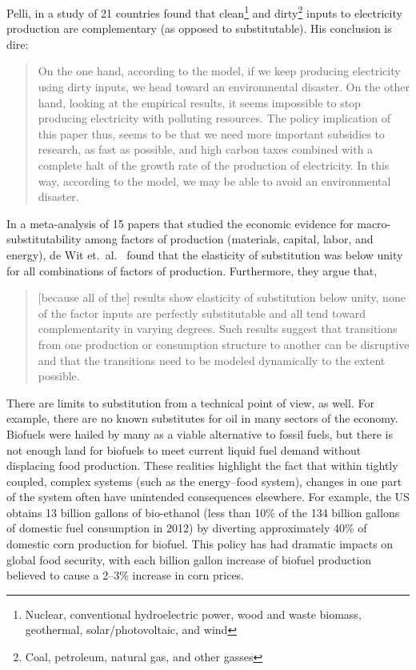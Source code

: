 Pelli, in a study of 21 countries 
found that clean\footnote{Nuclear, 
	conventional hydroelectric power, wood and waste biomass, 
	geothermal, solar/photovoltaic, and wind
	}
and dirty\footnote{Coal, 
	petroleum, natural gas, and other gasses
	}
inputs to electricity production
are complementary (as opposed to substitutable).\cite{Pelli:2012wv}
His conclusion is dire:

\begin{quote}
	On the one hand, according to the model, 
	if we keep producing electricity using dirty inputs, 
	we head toward an environmental disaster. 
	On the other hand, looking at the empirical results, 
	it seems impossible to stop producing electricity with polluting resources. 
	The policy implication of this paper thus, 
	seems to be that we need more important subsidies to research, 
	as fast as possible, 
	and high carbon taxes combined with a complete halt 
	of the growth rate of the production of electricity. 
	In this way, according to the model, 
	we may be able to avoid an environmental disaster.\cite[p.~25]{Pelli:2012wv}
\end{quote}

In a meta-analysis of 15 papers that studied 
the economic evidence for macro-substitutability
among factors of production (materials, capital, labor, and energy), 
de Wit et.\ al.~\cite{de-Wit:2013aa} found that the elasticity of substitution was 
below unity for all combinations of factors of production.
Furthermore, they argue that, 

\begin{quote}
	[because all of the] results show elasticity of substitution below unity, 
	none of the factor inputs are perfectly substitutable and 
	all tend toward complementarity in varying degrees. 
	Such results suggest that transitions 
	from one production or consumption structure to another 
	can be disruptive and that the transitions 
	need to be modeled dynamically to the extent possible.\cite[p.~8]{de-Wit:2013aa}
\end{quote}

There are limits to substitution from a technical point of view, as well.
For example, there are no known substitutes for oil 
in many sectors of the economy.\cite{Hirsch2005}
Biofuels were hailed by many as a viable alternative to fossil fuels, but
there is not enough land for biofuels to meet current liquid fuel demand
without displacing food production.
These realities highlight the fact that within tightly coupled, 
complex systems (such as the energy--food system), %
changes in one part of the system often have unintended consequences elsewhere.
For example, 
the US obtains 13 billion gallons of bio-ethanol 
(less than 10\% of the 134 billion gallons of domestic fuel consumption in 2012)
by diverting approximately 40\%
of domestic corn production for biofuel.\cite{EIA2014, USDA2014}
This policy has had dramatic impacts on global food security,
with each billion gallon increase of biofuel production believed to cause
a 2--3\% increase in corn prices.\cite{Kemick2013} 

